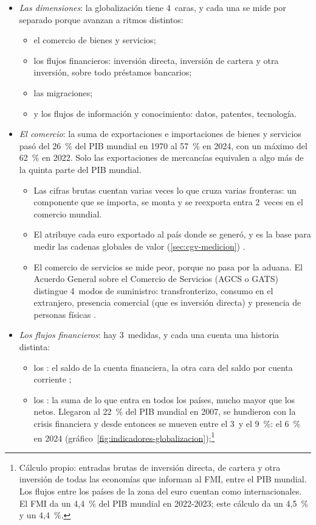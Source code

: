 \documentclass[11pt]{article}
\begin{document}
\begin{itemize}
\item \emph{Las dimensiones}: la globalización tiene 4~caras, y cada una se mide por separado porque avanzan a ritmos distintos:
  \begin{itemize}
  \item el comercio de bienes y servicios;
  \item los flujos financieros: inversión directa, inversión de cartera y otra inversión, sobre todo préstamos bancarios;
  \item las migraciones;
  \item y los flujos de información y conocimiento: datos, patentes, tecnología.
  \end{itemize}
\item \emph{El comercio}: la suma de exportaciones e importaciones de bienes y servicios pasó del 26~\% del PIB mundial en 1970 al 57~\% en 2024, con un máximo del 62~\% en 2022\nocite{BancoMundial2026Apertura}. Solo las exportaciones de mercancías equivalen a algo más de la quinta parte del PIB mundial\nocite{OMC2026GTOS,BM2026WDIMercancias}.
  \begin{itemize}
  \item Las cifras brutas cuentan varias veces lo que cruza varias fronteras: un componente que se importa, se monta y se reexporta entra 2~veces en el comercio mundial.
  \item El  atribuye cada euro exportado al país donde se generó, y es la base para medir las cadenas globales de valor (\ref{sec:cgv-medicion})\nocite{JohnsonNoguera2012} .
  \item El comercio de servicios se mide peor, porque no pasa por la aduana. El Acuerdo General sobre el Comercio de Servicios (AGCS o GATS) distingue 4~modos de suministro: transfronterizo, consumo en el extranjero, presencia comercial (que es inversión directa) y presencia de personas físicas .
  \end{itemize}
\item \emph{Los flujos financieros}: hay 3~medidas, y cada una cuenta una historia distinta:
  \begin{itemize}
  \item los : el saldo de la cuenta financiera, la otra cara del saldo por cuenta corriente ;
  \item los : la suma de lo que entra en todos los países, mucho mayor que los netos. Llegaron al 22~\% del PIB mundial en 2007, se hundieron con la crisis financiera y desde entonces se mueven entre el 3~y el 9~\%: el 6~\% en 2024 (gráfico~\ref{fig:indicadores-globalizacion})\nocite{FMI2026BOP,FMI2024ESR};\footnote{Cálculo propio: entradas brutas de inversión directa, de cartera y otra inversión de todas las economías que informan al FMI, entre el PIB mundial. Los flujos entre los países de la zona del euro cuentan como internacionales. El FMI da un 4,4~\% del PIB mundial en 2022-2023\nocite{FMI2024ESR}; este cálculo da un 4,5~\% y un 4,4~\%.}

\end{itemize}
\end{itemize}
\end{document}
